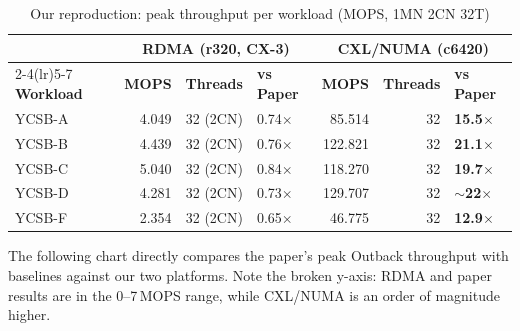 \documentclass[11pt,a4paper]{article}
\begin{document}
\begin{table}[H]
\centering
\caption{Our reproduction: peak throughput per workload (MOPS, 1MN 2CN 32T)}
\label{tab:our-peaks}
\small
\begin{tabular}{@{}lrrlrrl@{}}
\toprule
& \multicolumn{3}{c}{\textbf{RDMA (r320, CX-3)}} & \multicolumn{3}{c}{\textbf{CXL/NUMA (c6420)}} \\
\cmidrule(lr){2-4}\cmidrule(lr){5-7}
\textbf{Workload} & \textbf{MOPS} & \textbf{Threads} & \textbf{vs Paper} & \textbf{MOPS} & \textbf{Threads} & \textbf{vs Paper} \\
\midrule
YCSB-A & 4.049 & 32 (2CN) & 0.74$\times$ & 85.514 & 32 & \textbf{15.5$\times$} \\
YCSB-B & 4.439 & 32 (2CN) & 0.76$\times$ & 122.821 & 32 & \textbf{21.1$\times$} \\
YCSB-C & 5.040 & 32 (2CN) & 0.84$\times$ & 118.270 & 32 & \textbf{19.7$\times$} \\
YCSB-D & 4.281 & 32 (2CN) & 0.73$\times$ & 129.707 & 32 & \textbf{$\sim$22$\times$} \\
YCSB-F & 2.354 & 32 (2CN) & 0.65$\times$ & 46.775 & 32 & \textbf{12.9$\times$} \\
\bottomrule
\end{tabular}
\end{table}

The following chart directly compares the paper's peak Outback throughput with baselines against our two platforms. Note the broken y-axis: RDMA and paper results are in the 0--7\,MOPS range, while CXL/NUMA is an order of magnitude higher.
\end{document}
